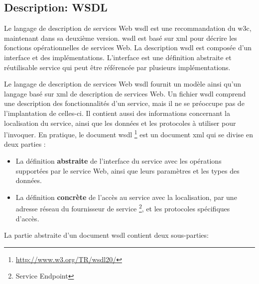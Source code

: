   \subsection{Description: WSDL}
  \label{sec:wsdl}

  Le langage de description de services Web \acrshort{wsdl}
  \cite{christensen2001web, chinnici2007web} est une recommandation du
  \acrshort{w3c}, maintenant dans sa deuxième version.
  \acrshort{wsdl} est basé sur \acrshort{xml} pour décrire les
  fonctions opérationnelles de services Web. La description
  \acrshort{wsdl} est composée d'un interface et des
  implémentations. L'interface est une définition abstraite et
  réutilisable service qui peut être référencée par plusieurs
  implémentations.

  

  Le langage de description de services Web \acrshort{wsdl}
  \cite{chinnici2007web} fournit un modèle ainsi qu'un langage basé
  sur \acrshort{xml} de description de services Web. Un fichier
  \acrshort{wsdl} comprend une description des fonctionnalités d'un
  service, mais il ne se préoccupe pas de l'implantation de celles-ci.
  Il contient aussi des informations concernant la localisation du
  service, ainsi que les données et les protocoles à utiliser pour
  l'invoquer. En pratique, le document \acrshort{wsdl}
  \footnote{\url{http://www.w3.org/TR/wsdl20/}} est un document
  \acrshort{xml} qui se divise en deux parties \cite{elie2010} :

  \SpecialItem
  \begin{itemize}
  \item La définition \textbf{abstraite} de l'interface du service
    avec les opérations supportées par le service Web, ainsi que leurs
    paramètres et les types des données.

  \item La définition \textbf{concrète} de l'accès au service avec la
    localisation, par une adresse réseau du fournisseur de service
    \footnote{Service Endpoint}, et les protocoles spécifiques
    d'accès.
  \end{itemize}
  \enddescription

  La partie abstraite d'un document \acrshort{wsdl} contient deux
  sous-parties:

